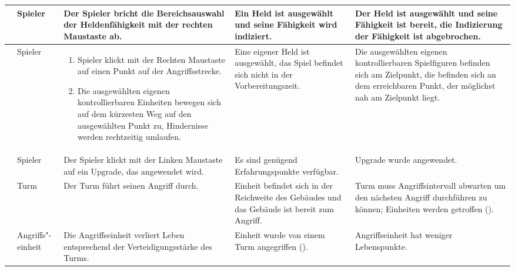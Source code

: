 \begin{longtabu}{X[0.6L]X[0.4L]X[L]X[L]X[L]}
	& Spieler
	& Der Spieler bricht die Bereichsauswahl der Heldenfähigkeit mit der rechten Maustaste ab.
	& Ein Held ist ausgewählt und seine Fähigkeit wird indiziert.
	& Der Held ist ausgewählt und seine Fähigkeit ist bereit, die Indizierung der Fähigkeit ist abgebrochen.
	\\\midrule

    & Spieler
    & \vspace*{-0.2cm}\begin{enumerate}[nosep,leftmargin=*]
        \item Spieler klickt mit der Rechten Maustaste auf einen Punkt auf der
          Angriffsstrecke.
        \item Die ausgewählten eigenen kontrollierbaren Einheiten bewegen sich
          auf dem kürzesten Weg auf den ausgewählten Punkt zu, Hindernisse
          werden rechtzeitig umlaufen.
      \end{enumerate}
    & Eine eigener Held ist ausgewählt, das Spiel befindet sich nicht in der
      Vorbereitungszeit.
    & Die ausgewählten eigenen kontrollierbaren Spielfiguren befinden sich am
      Zielpunkt, \textbf{} die befinden sich an dem erreichbaren
      Punkt, der möglichst nah am Zielpunkt liegt.
  \\\midrule

    & Spieler
    & Der Spieler klickt mit der Linken Maustaste auf ein Upgrade, das
      angewendet wird.
    & Es sind genügend Erfahrungspunkte verfügbar.
    & Upgrade wurde angewendet.
  \\\midrule

    & Turm
    & Der Turm führt seinen Angriff durch.
    & Einheit befindet sich in der Reichweite des Gebäudes und das Gebäude ist
      bereit zum Angriff.
    & Turm muss Angriffsintervall abwarten um den nächsten Angriff durchführen
      zu können; Einheiten werden getroffen ().
  \\\midrule

    & Angriffs"-einheit
    & Die Angriffseinheit verliert Leben entsprechend der Verteidigungsstärke
      des Turms.
    & Einheit wurde von einem Turm angegriffen ().
    & Angriffseinheit hat weniger Lebenspunkte.
  \\\midrule


\end{longtabu}
